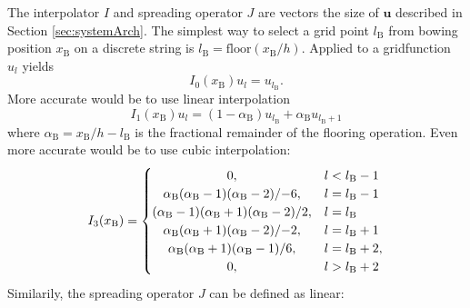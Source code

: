 \documentclass[twoside,a4paper,dvipsnames]{article}
\begin{document}
The interpolator $I$ and spreading operator $J$ are vectors the size of $\mathbf{u}$ described in Section \ref{sec:systemArch}. The simplest way to select a grid point $l_\text{B}$ from bowing position $x_\text{B}$ on a discrete string is $l_\text{B} = \text{floor}(x_\text{B}/h)$. Applied to a gridfunction $u_l$ yields
\begin{equation}
    I_0(x_\text{B})u_l = u_{l_\text{B}}.
\end{equation}
More accurate would be to use linear interpolation 
\begin{equation}\label{eq:linearInterpolation}
     I_1(x_\text{B})u_l =
      (1-\alpha_\text{B})u_{l_\text{B}}+ \alpha_\text{B}u_{l_\text{B}+1}
\end{equation}
where $\alpha_\text{B} = x_\text{B}/h - l_\text{B}$ is the fractional remainder of the flooring operation. Even more accurate would be to use cubic interpolation:
\begin{equation}
I_3(x_\text{B}) =
     \begin{cases}
    \hfil 0, & l < l_{\text{B}} - 1\\
    \hfil \alpha_\text{B}(\alpha_\text{B}-1)(\alpha_\text{B} - 2)/{-6}, & l = l_{\text{B}} - 1\\
    \hfil (\alpha_\text{B}-1)(\alpha_\text{B}+1)(\alpha_\text{B}-2)/2, & l = l_{\text{B}}\\
    \hfil \alpha_\text{B}(\alpha_\text{B}+1)(\alpha_\text{B} - 2)/{-2}, & l = l_{\text{B}} + 1\\
    \hfil \alpha_\text{B}(\alpha_\text{B}+1)(\alpha_\text{B} - 1)/6, & l = l_{\text{B}} +2,\\
    \hfil 0, & l > l_\text{B} + 2
    \end{cases}
    \end{equation}
Similarily, the spreading operator $J$ can be defined as linear:
\end{document}
